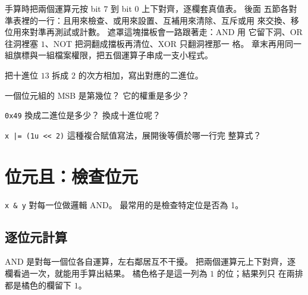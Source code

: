 手算時把兩個運算元按 bit $7$ 到 bit $0$ 上下對齊，逐欄套真值表。 後面
五節各對準表裡的一行：且用來檢查、或用來設置、互補用來清除、互斥或用
來交換、移位用來對準再測試或計數。 遮罩這塊擋板會一路跟著走：AND 用
它留下洞、OR 往洞裡塞 $1$、NOT 把洞翻成擋板再清位、XOR 只翻洞裡那一
格。 章末再用同一組旗標與一組檔案權限，把五個運算子串成一支小程式。

\begin{drills}[label=drills:bit-basics]
\item 把十進位 $13$ 拆成 $2$ 的次方相加，寫出對應的二進位。
\item 一個位元組的 MSB 是第幾位？ 它的權重是多少？
\item \texttt{0x49} 換成二進位是多少？ 換成十進位呢？
\item \texttt{x |= (1u << 2)} 這種複合賦值寫法，展開後等價於哪一行完
整算式？
\end{drills}

\section{位元且：檢查位元}
\label{sec:bit-and}

\texttt{x \& y} 對每一位做邏輯 AND。 最常用的是檢查特定位是否為 1。


\subsection[逐位元計算：AND]{逐位元計算}

AND 是對每一個位各自運算，左右鄰居互不干擾。 把兩個運算元上下對齊，逐
欄看過一次，就能用手算出結果。 橘色格子是這一列為 $1$ 的位；結果列只
在兩排都是橘色的欄留下 $1$。

